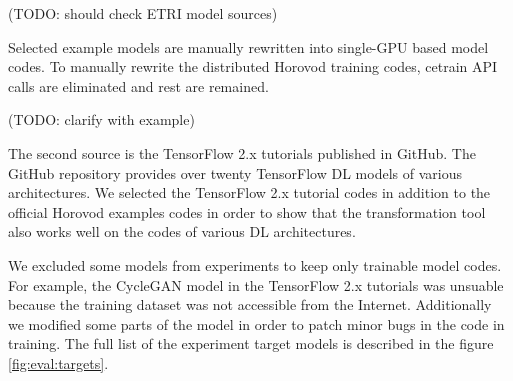 (TODO: should check ETRI model sources)

Selected example models are manually rewritten into
single-GPU based model codes. To manually rewrite the distributed Horovod
training codes, cetrain API calls are eliminated and rest are remained.   

(TODO: clarify with example)

The second source is the TensorFlow 2.x tutorials published in
GitHub\cite{tf2tutogithub}. The GitHub repository provides over twenty
TensorFlow DL models of various architectures. 
We selected the TensorFlow 2.x tutorial codes in addition to the official
Horovod examples codes in order to show that the transformation tool
also works well on the codes of various DL architectures.

We excluded some models from experiments to keep only trainable model codes. 
For example, the CycleGAN model in the TensorFlow 2.x tutorials
was unsuable because the training dataset was not accessible from the
Internet. Additionally we modified some parts of the model in order to patch
minor bugs in the code in training.
The full list of the experiment target models is described in the
figure \ref{fig:eval:targets}.

